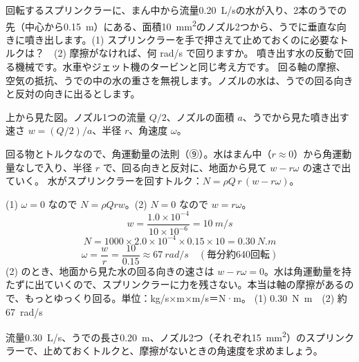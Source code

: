 \begin{phreidai}[回るスプリンクラー]
\label{ph:力-13:ex14}回転するスプリンクラーに、まん中から流量\qty{0.20}{L/s}の水が入り、2本のうでの先（中心から\qty{0.15}{m}）にある、面積\qty{10}{mm^2}のノズル2つから、うでに垂直な向きに噴き出します。(1) スプリンクラーを手で押さえて止めておくのに必要なトルクは？　(2) 摩擦がなければ、何 rad/s で回りますか。
\phbamen
噴き出す水の反動で回る機械です。水車やジェット機のタービンと同じ考え方です。
\phmushi
回る軸の摩擦、空気の抵抗、うでの中の水の重さを無視します。ノズルの水は、うでの回る向きと反対の向きに出るとします。
\phzu
\noindent\begin{minipage}[c]{0.40\linewidth}\centering
{}
\end{minipage}\hfill
\begin{minipage}[c]{0.57\linewidth}\raggedright
上から見た図。ノズル1つの流量 $Q/2$、ノズルの面積 $a$、うでから見た噴き出す速さ $w=(Q/2)/a$、半径 $r$、角速度 $\omega$。
\end{minipage}
\phriyu
回る物とトルクなので、角運動量の法則（⑨）。水はまん中（$r\approx0$）から角運動量なしで入り、半径 $r$ で、回る向きと反対に、地面から見て $w-r\omega$ の速さで出ていく。
\phtateru
水がスプリンクラーを回すトルク：$N=\rho Q\,r\,(w-r\omega)$。\par
(1) $\omega=0$ なので $N=\rho Q r w$。(2) $N=0$ なので $w=r\omega$。
\phtoku
\[ w=\frac{1.0\times10^{-4}}{10\times10^{-6}}=\qty{10}{m/s} \]
\[ N=1000\times2.0\times10^{-4}\times0.15\times10=\qty{0.30}{N.m} \]
\[ \omega=\frac{w}{r}=\frac{10}{0.15}\approx\qty{67}{rad/s}\quad(\text{毎分約640回転}) \]
\phtashikame
(2) のとき、地面から見た水の回る向きの速さは $w-r\omega=0$。水は角運動量を持たずに出ていくので、スプリンクラーに力を残さない。本当は軸の摩擦があるので、もっとゆっくり回る。単位：kg/s×m×m/s＝N·m。
\kotae (1) \qty{0.30}{N.m}　(2) 約\qty{67}{rad/s}
\end{phreidai}
\begin{jibun}
流量\qty{0.30}{L/s}、うでの長さ\qty{0.20}{m}、ノズル2つ（それぞれ\qty{15}{mm^2}）のスプリンクラーで、止めておくトルクと、摩擦がないときの角速度を求めましょう。
\end{jibun}

